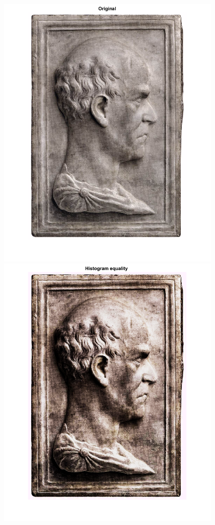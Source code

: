 \documentclass[conference]{IEEEtran}
\begin{document}
\begin{figure}[ht]
\begin{multicols}{2}
    \includegraphics[width=\linewidth]{histeq11.png}\par 
    \includegraphics[width=\linewidth]{histeq12.png}\par 

\end{multicols}
\end{figure}
\end{document}
